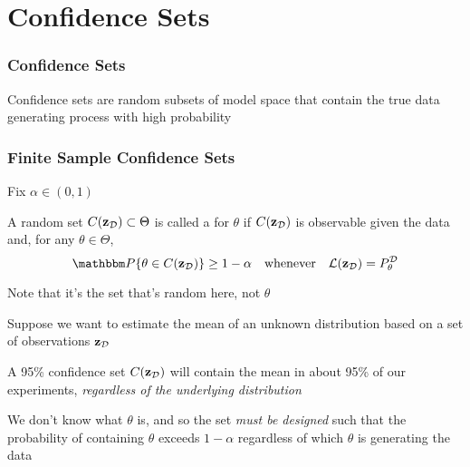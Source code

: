 \section{Confidence Sets}

\begin{frame}\frametitle{Confidence Sets}
    
    \vspace{2em}
    Confidence sets are random subsets of model space that contain the true data
    generating process with high probability
    
\end{frame}

\begin{frame}\frametitle{Finite Sample Confidence Sets}

    \vspace{2em}
    Fix $\alpha \in (0,1)$
    
    A random set $C(\mathbf{z}_{\mathcal D}) \subset \Theta$ 
    is called a  for $\theta$ if
    $C(\mathbf{z}_{\mathcal D})$ is observable given the data and, for any $\theta \in
    \Theta$,
    \begin{equation*}
        \label{eq:proci}
        \PP \{ \theta  \in C(\zdata) \} \geq 1 - \alpha
        \quad \text{whenever} \quad
        \lL(\zdata) = \Pdatatheta
    \end{equation*}
    
    \vspace{.7em}
    Note that it's the set that's random here, not $\theta$
        
\end{frame}

\begin{frame}

    \vspace{2em}
    Suppose we want to estimate the mean of an unknown
    distribution based on a set of observations $\mathbf{z}_{\mathcal D}$
    
    \vspace{.7em}
    A 95\% confidence set $C(\mathbf{z}_{\mathcal D})$ will
    contain the mean in about 95\% of our experiments, \emph{regardless of the 
    underlying distribution}
    
    \vspace{.7em}
    We don't know what $\theta$ is, and so
    the set \emph{must be designed} such that the probability of containing
    $\theta$ exceeds $1 - \alpha$ regardless of which $\theta$ is generating the
    data
    
\end{frame}

